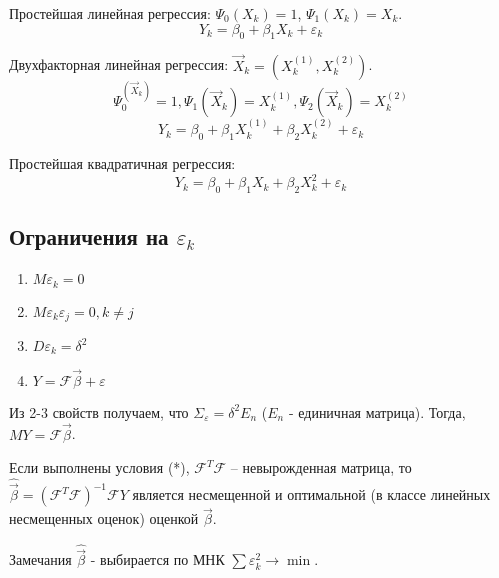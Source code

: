 \begin{ex}
  Простейшая линейная регрессия: $\Psi_0(X_k) = 1$, $\Psi_1(X_k) = X_k$.
  \[
    Y_k = \beta_0 + \beta_1 X_k + \varepsilon_k
  \]
\end{ex}
  Двухфакторная линейная регрессия: $\vec{X}_k = (X_k^{(1)}, X_k^{(2)})$.
  \[
    \Psi_0^(\vec{X}_k) = 1, \Psi_1(\vec{X}_k) = X_k^{(1)}, \Psi_2(\vec{X}_k) = X_k^{(2)}
  \]
  \[
    Y_k = \beta_0 + \beta_1 X_k^{(1)} + \beta_2 X_k^{(2)} + \varepsilon_k
  \]
\begin{ex}
  Простейшая квадратичная регрессия:
  \[
    Y_k = \beta_0 + \beta_1 X_k + \beta_2 X_k^2 + \varepsilon_k
  \]
\end{ex}

\subsection{Ограничения на $\varepsilon_k$}

\begin{enumerate}
  \item $M\varepsilon_k = 0$
  \item $M\varepsilon_k \varepsilon_j = 0, k \neq j$
  \item $D \varepsilon_k = \delta^2$
  \item $Y = \mathcal{F} \vec{\beta} + \varepsilon$
\end{enumerate}

Из 2-3 свойств получаем, что $\Sigma_\varepsilon = \delta^2 E_n$ ($E_n$ - единичная матрица).
Тогда, $MY = \mathcal{F} \vec{\beta}$.

\begin{theorem}
  Если выполнены условия (*), $\mathcal{F}^T \mathcal{F}$ -- невырожденная матрица, то
  $\hat{\vec{\beta}} = (\mathcal{F}^T \mathcal{F})^{-1} \mathcal{F} Y$ является несмещенной и оптимальной (в классе линейных несмещенных оценок) оценкой $\vec{\beta}$.
\end{theorem}

Замечания $\hat{\vec{\beta}}$ - выбирается по МНК $\sum \varepsilon_k^2 \to \min$.


